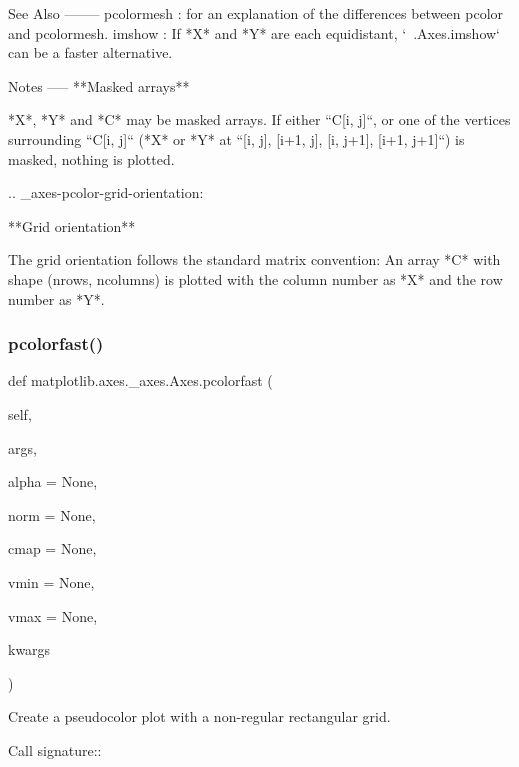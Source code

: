 \begin{DoxyVerb}
\begin{DoxyVerb}

See Also
--------
pcolormesh : for an explanation of the differences between
    pcolor and pcolormesh.
imshow : If *X* and *Y* are each equidistant, `~.Axes.imshow` can be a
    faster alternative.

Notes
-----
**Masked arrays**

*X*, *Y* and *C* may be masked arrays. If either ``C[i, j]``, or one
of the vertices surrounding ``C[i, j]`` (*X* or *Y* at
``[i, j], [i+1, j], [i, j+1], [i+1, j+1]``) is masked, nothing is
plotted.

.. _axes-pcolor-grid-orientation:

**Grid orientation**

The grid orientation follows the standard matrix convention: An array
*C* with shape (nrows, ncolumns) is plotted with the column number as
*X* and the row number as *Y*.
\end{DoxyVerb}
 \mbox{\label{classmatplotlib_1_1axes_1_1__axes_1_1Axes_a2b58a8da3ff2f5a04c32cfff1cdfbe88}} 
\subsubsection{\texorpdfstring{pcolorfast()}{pcolorfast()}}
{\footnotesize\ttfamily def matplotlib.\+axes.\+\_\+axes.\+Axes.\+pcolorfast (\begin{DoxyParamCaption}\item[{}]{self,  }\item[{}]{args,  }\item[{}]{alpha = {\ttfamily None},  }\item[{}]{norm = {\ttfamily None},  }\item[{}]{cmap = {\ttfamily None},  }\item[{}]{vmin = {\ttfamily None},  }\item[{}]{vmax = {\ttfamily None},  }\item[{}]{kwargs }\end{DoxyParamCaption})}

\begin{DoxyVerb}Create a pseudocolor plot with a non-regular rectangular grid.

Call signature::


\end{DoxyVerb}
\end{DoxyVerb}
